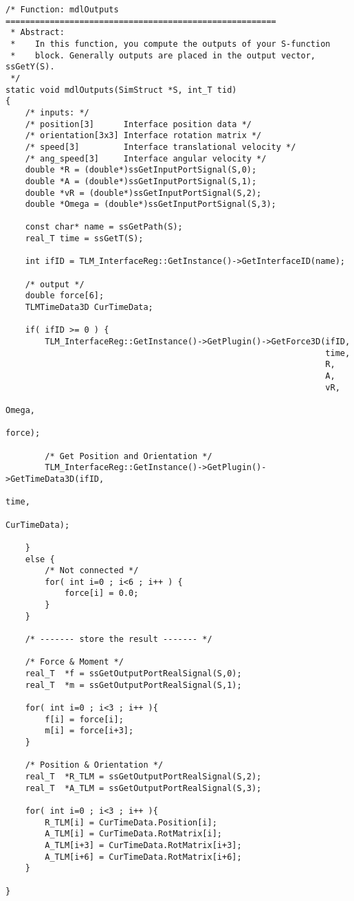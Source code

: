 {\scriptsize
\begin{verbatim}
/* Function: mdlOutputs =======================================================
 * Abstract:
 *    In this function, you compute the outputs of your S-function
 *    block. Generally outputs are placed in the output vector, ssGetY(S).
 */
static void mdlOutputs(SimStruct *S, int_T tid)
{
    /* inputs: */
    /* position[3]      Interface position data */
    /* orientation[3x3] Interface rotation matrix */
    /* speed[3]         Interface translational velocity */
    /* ang_speed[3]     Interface angular velocity */
    double *R = (double*)ssGetInputPortSignal(S,0);
    double *A = (double*)ssGetInputPortSignal(S,1);
    double *vR = (double*)ssGetInputPortSignal(S,2);
    double *Omega = (double*)ssGetInputPortSignal(S,3);

    const char* name = ssGetPath(S);
    real_T time = ssGetT(S);

    int ifID = TLM_InterfaceReg::GetInstance()->GetInterfaceID(name);

    /* output */
    double force[6];
    TLMTimeData3D CurTimeData;

    if( ifID >= 0 ) {
        TLM_InterfaceReg::GetInstance()->GetPlugin()->GetForce3D(ifID,
                                                                 time,
                                                                 R,
                                                                 A,
                                                                 vR,
                                                                 Omega,
                                                                 force);

        /* Get Position and Orientation */
        TLM_InterfaceReg::GetInstance()->GetPlugin()->GetTimeData3D(ifID,
                                                                    time,
                                                                    CurTimeData);

    }
    else {
        /* Not connected */
        for( int i=0 ; i<6 ; i++ ) {
            force[i] = 0.0;
        }
    }

    /* ------- store the result ------- */

    /* Force & Moment */
    real_T  *f = ssGetOutputPortRealSignal(S,0);
    real_T  *m = ssGetOutputPortRealSignal(S,1);

    for( int i=0 ; i<3 ; i++ ){
        f[i] = force[i];
        m[i] = force[i+3];
    }

    /* Position & Orientation */
    real_T  *R_TLM = ssGetOutputPortRealSignal(S,2);
    real_T  *A_TLM = ssGetOutputPortRealSignal(S,3);

    for( int i=0 ; i<3 ; i++ ){
        R_TLM[i] = CurTimeData.Position[i];
        A_TLM[i] = CurTimeData.RotMatrix[i];
        A_TLM[i+3] = CurTimeData.RotMatrix[i+3];
        A_TLM[i+6] = CurTimeData.RotMatrix[i+6];
    }

}
\end{verbatim}
}


